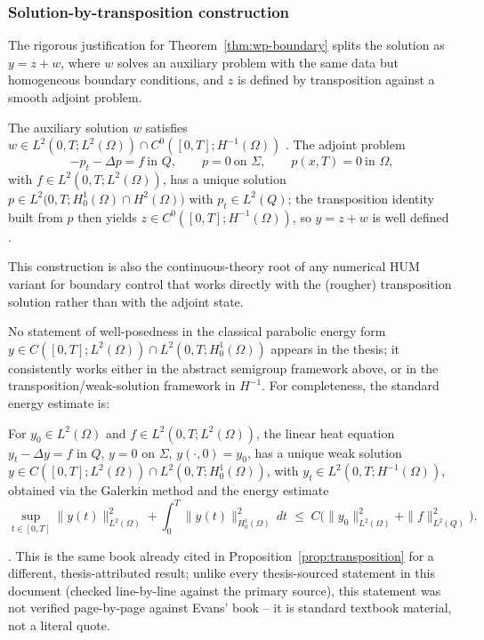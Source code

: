 \subsubsection*{Solution-by-transposition construction}

The rigorous justification for Theorem~\ref{thm:wp-boundary} splits the
solution as $y = z + w$, where $w$ solves an auxiliary problem with the same
data but homogeneous boundary conditions, and $z$ is defined by transposition
against a smooth adjoint problem.

\begin{proposition}
  \label{prop:transposition}
  The auxiliary solution $w$ satisfies
  $w \in L^2(0,T;L^2(\Omega)) \cap C^0([0,T];H^{-1}(\Omega))$
  \citep{evans2010partial}. The adjoint problem
  \[
    -p_t - \Delta p = f \ \text{in } Q, \qquad p = 0 \ \text{on } \Sigma,
    \qquad p(x,T) = 0 \ \text{in } \Omega,
  \]
  with $f \in L^2(0,T;L^2(\Omega))$, has a unique solution
  $p \in L^2\big(0,T; H^1_0(\Omega)\cap H^2(\Omega)\big)$ with
  $p_t \in L^2(Q)$; the transposition identity built from $p$ then yields
  $z \in C^0([0,T];H^{-1}(\Omega))$, so $y = z+w$ is well defined
  \citep{lions2012non}.
\end{proposition}

This construction is also the continuous-theory root of any numerical HUM
variant for boundary control that works directly with the (rougher)
transposition solution rather than with the adjoint state.

\begin{remark}
  \label{rem:energy-wellposedness}
  No statement of well-posedness in the classical parabolic energy form
  $y \in C([0,T];L^2(\Omega)) \cap L^2(0,T;H^1_0(\Omega))$ appears in the
  thesis; it consistently works either in the abstract semigroup framework
  above, or in the transposition/weak-solution framework in $H^{-1}$. For
  completeness, the standard energy estimate is:
  \begin{theorem}
    For $y_0 \in L^2(\Omega)$ and $f \in L^2(0,T;L^2(\Omega))$, the linear heat
    equation $y_t - \Delta y = f$ in $Q$, $y=0$ on $\Sigma$, $y(\cdot,0)=y_0$,
    has a unique weak solution
    $y \in C([0,T];L^2(\Omega)) \cap L^2(0,T;H^1_0(\Omega))$, with
    $y_t \in L^2(0,T;H^{-1}(\Omega))$, obtained via the Galerkin method and the
    energy estimate
    \[
      \sup_{t\in[0,T]}\|y(t)\|_{L^2(\Omega)}^2
      + \int_0^T \|y(t)\|_{H^1_0(\Omega)}^2\,dt
      \;\le\; C\Big(\|y_0\|_{L^2(\Omega)}^2 + \|f\|_{L^2(Q)}^2\Big).
    \]
  \end{theorem}
  \citep[\S 7.1]{evans2010partial}. This is the same book already cited in
  Proposition~\ref{prop:transposition} for a different, thesis-attributed
  result; unlike every thesis-sourced statement in this document (checked
  line-by-line against the primary source), this statement was not verified
  page-by-page against Evans' book -- it is standard textbook material, not a
  literal quote.
\end{remark}
